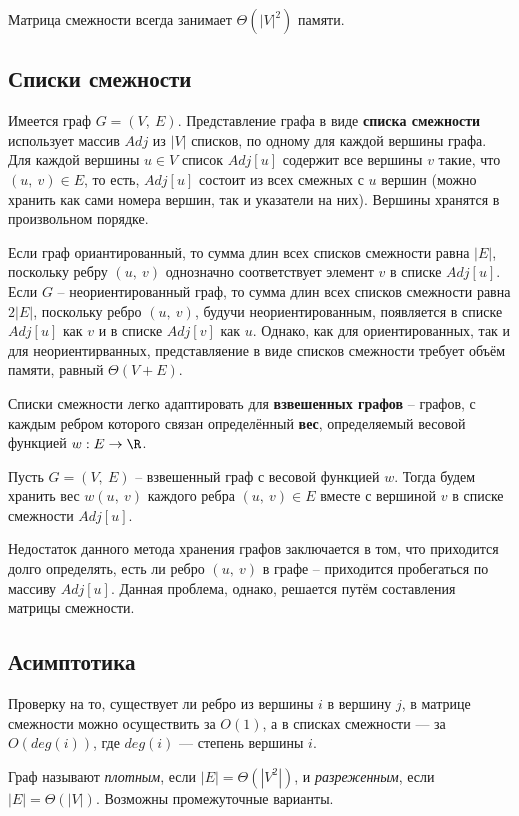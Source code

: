 \documentclass[a4paper,12pt]{article}
\begin{document}
Матрица смежности всегда занимает $\Theta(|V|^2)$ памяти.

\subsection{Списки смежности}

Имеется граф $G = (V,\ E)$. Представление графа в виде \textbf{списка смежности} использует массив $Adj$ из $|V|$ списков, по одному для каждой вершины графа. Для каждой вершины $u \in V$ список $Adj[u]$ содержит все вершины $v$ такие, что $(u,\ v) \in E$, то есть, $Adj[u]$ состоит из всех смежных с $u$ вершин (можно хранить как сами номера вершин, так и указатели на них). Вершины хранятся в произвольном порядке.

Если граф ориантированный, то сумма длин всех списков смежности равна $|E|$, поскольку ребру $(u,\ v)$ однозначно соответствует элемент $v$ в списке $Adj[u]$. Если $G$ -- неориентированный граф, то сумма длин всех списков смежности равна $2|E|$, поскольку ребро $(u,\ v)$, будучи неориентированным, появляется в списке $Adj[u]$ как $v$ и в списке $Adj[v]$ как $u$. Однако, как для ориентированных, так и для неориентирванных, представляение в виде списков смежности требует объём памяти, равный $\Theta(V + E)$.

Списки смежности легко адаптировать для \textbf{взвешенных графов} -- графов, с каждым ребром которого связан определённый \textbf{вес}, определяемый весовой функцией $w : E \to \R$.

Пусть $G = (V,\ E)$ -- взвешенный граф с весовой функцией $w$. Тогда будем хранить вес $w(u,\ v)$ каждого ребра $(u,\ v)\in E$ вместе с вершиной $v$ в списке смежности $Adj[u]$.

Недостаток данного метода хранения графов заключается в том, что приходится долго определять, есть ли ребро $(u,\ v)$ в графе -- приходится пробегаться по массиву $Adj[u]$. Данная проблема, однако, решается путём составления матрицы смежности.

\subsection{Асимптотика}

Проверку на то, существует ли ребро из вершины $i$ в вершину $j$, в матрице смежности можно осуществить за $O(1)$, а в списках смежности --- за $O(deg(i))$, где $deg(i)$ --- степень вершины $i$.

Граф называют \emph{плотным}, если $|E| = \Theta(|V^2|)$, и \emph{разреженным}, если $|E| = \Theta(|V|)$. Возможны промежуточные варианты.
\end{document}
